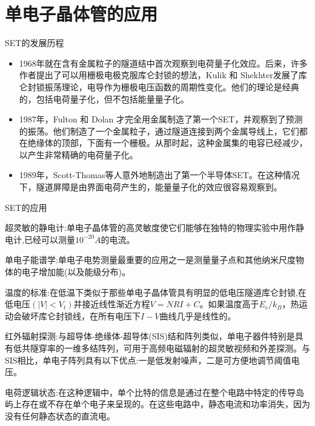 \documentclass{beamer}[fontset=windows]
\begin{document}
    \section{单电子晶体管的应用}
    \begin{frame}
    \begin{block}{SET的发展历程}
    \begin{itemize}
    \item 1968年就在含有金属粒子的隧道结中首次观察到电荷量子化效应。后来，许多作者提出了可以用栅极电极克服库仑封锁的想法，Kulik 和 Shekhter发展了库仑封锁振荡理论，电导作为栅极电压函数的周期性变化。他们的理论是经典的，包括电荷量子化，但不包括能量量子化。
    \item 1987年，Fulton 和 Dolan 才完全用金属制造了第一个SET，并观察到了预测的振荡。他们制造了一个金属粒子，通过隧道连接到两个金属导线上，它们都在绝缘体的顶部，下面有一个栅极。从那时起，这种金属集的电容已经减少，以产生非常精确的电荷量子化。
    \item 1989年，Scott-Thomas等人意外地制造出了第一个半导体SET。在这种情况下，隧道屏障是由界面电荷产生的，能量量子化的效应很容易观察到。
    \end{itemize}
    \end{block}
    \end{frame}
    \begin{frame}
    \begin{block}{SET的应用}
    \begin{itemize}\small{
    \item 超灵敏的静电计:单电子晶体管的高灵敏度使它们能够在独特的物理实验中用作静电计,已经可以测量$10^{-20} A$的电流。
    \item 单电子能谱学:单电子电势测量最重要的应用之一是测量量子点和其他纳米尺度物体的电子增加能(以及能级分布)。
    \item 温度的标准:在低温下类似于那些单电子晶体管具有明显的低电压隧道库仑封锁,在低电压$(|V|<V_{t})$并接近线性渐近方程$V=NRI+C$。如果温度高于$E_{c}/k_{B}$，热运动会破坏库仑封锁线，在所有电压下$I-V$曲线几乎是线性的。
    \item 红外辐射探测:与超导体-绝缘体-超导体(SIS)结和阵列类似，单电子器件特别是具有低共隧穿率的一维多结阵列，可用于高频电磁辐射的超灵敏视频和外差探测。与SIS相比，单电子阵列具有以下优点:一是低发射噪声，二是可方便地调节阈值电压。
    \item 电荷逻辑状态:在这种逻辑中，单个比特的信息是通过在整个电路中特定的传导岛屿上存在或不存在单个电子来呈现的。在这些电路中，静态电流和功率消失，因为没有任何静态状态的直流电。}
    \end{itemize}
    \end{block}
    \end{frame}
\end{document}
